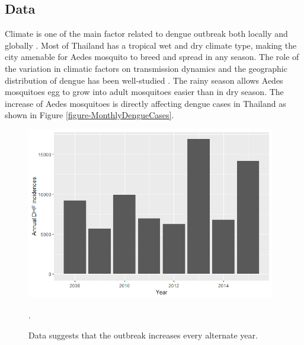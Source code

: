 \documentclass{bmcart}
\begin{document}
\subsection{Data}

Climate is one of the main factor related to dengue outbreak both locally and globally \cite{johansson2009multiyear, morin2013climate}. Most of Thailand has a tropical wet and dry climate type, making the city amenable for Aedes mosquito to breed and spread in any season. The role of the variation in climatic factors on transmission dynamics and the geographic distribution of dengue has been well-studied \cite{thai2011role}. The rainy season allows Aedes mosquitoes egg to grow into adult mosquitoes easier than in dry season. The increase of Aedes mosquitoes is directly affecting dengue cases in Thailand as shown in Figure \ref{figure-MonthlyDengueCases}.

\begin{figure}[htbp]
	\begin{center}
		\includegraphics[width= 0.97\textwidth]{3-AnuualDengueCases}
		\caption{Data suggests that the outbreak increases every alternate year.}.
		\label{figure-AnuualDengueCases}
	\end{center}
\end{figure}
\end{document}
